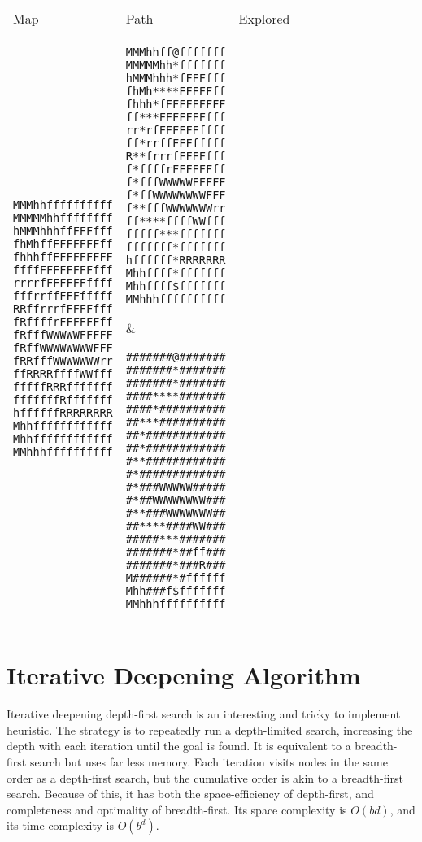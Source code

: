 \documentclass[12pt, article]{scrartcl}
\begin{document}
\begin{tabular}{p{2in} p{2in} p{2in}}
Map & Path & Explored \\

\begin{verbatim}
MMMhhffffffffff
MMMMMhhffffffff
hMMMhhhffFFFfff
fhMhffFFFFFFFff
fhhhffFFFFFFFFF
ffffFFFFFFFFfff
rrrrfFFFFFFffff
fffrrffFFFfffff
RRffrrrfFFFFfff
fRffffrFFFFFFff
fRfffWWWWWFFFFF
fRffWWWWWWWWFFF
fRRfffWWWWWWWrr
ffRRRRffffWWfff
fffffRRRfffffff
fffffffRfffffff
hffffffRRRRRRRR
Mhhffffffffffff
Mhhffffffffffff
MMhhhffffffffff
\end{verbatim}
&
\begin{verbatim}
MMMhhff@fffffff
MMMMMhh*fffffff
hMMMhhh*fFFFfff
fhMh****FFFFFff
fhhh*fFFFFFFFFF
ff***FFFFFFFfff
rr*rfFFFFFFffff
ff*rrffFFFfffff
R**frrrfFFFFfff
f*ffffrFFFFFFff
f*fffWWWWWFFFFF
f*ffWWWWWWWWFFF
f**fffWWWWWWWrr
ff****ffffWWfff
fffff***fffffff
fffffff*fffffff
hffffff*RRRRRRR
Mhhffff*fffffff
Mhhffff$fffffff
MMhhhffffffffff
\end{verbatim}
&
\begin{verbatim}
#######@#######
#######*#######
#######*#######
####****#######
####*##########
##***##########
##*############
##*############
#**############
#*#############
#*###WWWWW#####
#*##WWWWWWWW###
#**###WWWWWWW##
##****####WW###
#####***#######
#######*##ff###
#######*###R###
M######*#ffffff
Mhh###f$fffffff
MMhhhffffffffff
\end{verbatim}
\end{tabular}

\section{Iterative Deepening Algorithm}
Iterative deepening depth-first search is an interesting and tricky to implement heuristic. The strategy is to repeatedly run a depth-limited search, increasing the depth with each iteration until the goal is found. It is equivalent to a breadth-first search but uses far less memory. Each iteration visits nodes in the same order as a depth-first search, but the cumulative order is akin to a breadth-first search. Because of this, it has both the space-efficiency of depth-first, and completeness and optimality of breadth-first. Its space complexity is $O(bd)$, and its time complexity is $O(b^d)$. \\
\end{document}
